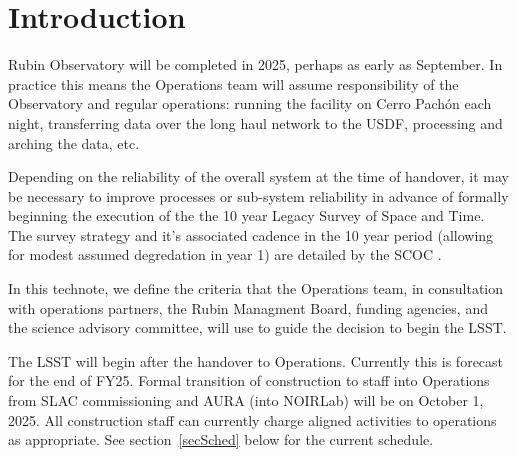 \section{Introduction}

Rubin Observatory will be completed in 2025, perhaps as early as September. In practice this means the Operations team \cite[see][]{RDO-018} will assume responsibility of the Observatory and regular operations: running the facility on Cerro Pach\'{o}n each night, transferring data over the long haul network to the USDF, processing and arching the data, etc. 

Depending on the reliability of the overall system at the time of handover, it may be necessary to improve processes or sub-system reliability in advance of formally beginning the execution of the the 10 year Legacy Survey of Space and Time. The survey strategy and it's associated cadence in the 10 year period (allowing for modest assumed degredation in year 1) are detailed by the SCOC \cite[]{PSTN-056}. 

In this technote, we define the criteria that the Operations team, in consultation with operations partners, the Rubin Managment Board, funding agencies, and the science advisory committee, will use to guide the decision to begin the LSST. 

The LSST will begin after the handover to Operations. Currently this is forecast for the end of FY25. Formal transition of construction to staff into Operations from SLAC commissioning and AURA (into NOIRLab) will be on October 1, 2025. All construction staff can currently charge aligned activities to operations as appropriate. See section~\ref{secSched} below for the current schedule.  

